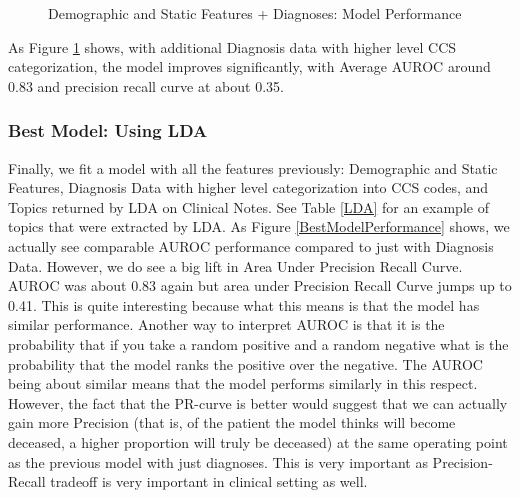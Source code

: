 \documentclass[12pt, final]{article}
\begin{document}
\begin{figure}[H]
\centering     %
{}
\caption{Demographic and Static Features + Diagnoses: Model Performance}
\label{ImprovedModelPerformance}
\end{figure}

As Figure \ref{ImprovedModelPerformance} shows, with additional Diagnosis data with higher level CCS categorization, the model improves significantly, with Average AUROC around 0.83 and precision recall curve at about 0.35.

\subsubsection{Best Model: Using LDA}
Finally, we fit a model with all the features previously: Demographic and Static Features, Diagnosis Data with higher level categorization into CCS codes, and Topics returned by LDA on Clinical Notes. See Table \ref{LDA} for an example of topics that were extracted by LDA. As Figure \ref{BestModelPerformance} shows, we actually see comparable AUROC performance compared to just with Diagnosis Data. However, we do see a big lift in Area Under Precision Recall Curve. AUROC was about 0.83 again but area under Precision Recall Curve jumps up to 0.41. This is quite interesting because what this means is that the model has similar performance. Another way to interpret AUROC is that it is the probability that if you take a random positive and a random negative what is the probability that the model ranks the positive over the negative. The AUROC being about similar means that the model performs similarly in this respect. However, the fact that the PR-curve is better would suggest that we can actually gain more Precision (that is, of the patient the model thinks will become deceased, a higher proportion will truly be deceased) at the same operating point as the previous model with just diagnoses. This is very important as Precision-Recall tradeoff is very important in clinical setting as well.
\end{document}
